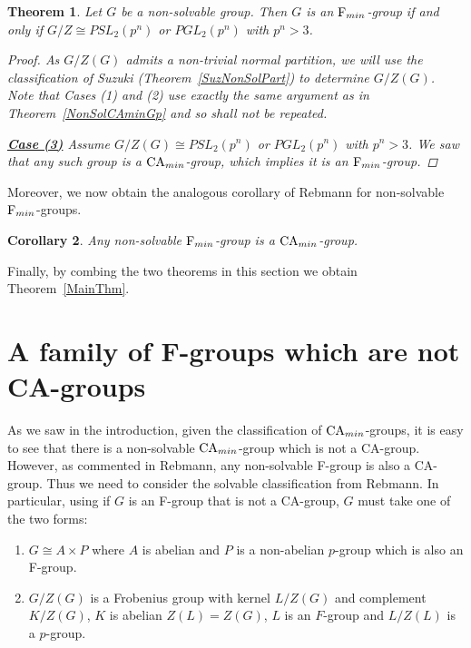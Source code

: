 \documentclass[a4paper,11pt]{article}
\theoremstyle{plain}
\newtheorem{thm}{Theorem}[section]
\newtheorem{cor}[thm]{Corollary}
\numberwithin{thm}{section}
\begin{document}
\begin{thm}
Let $G$ be a non-solvable group.
Then $G$ is an ${\rm F}_{min}$-group if and only if  $G/Z\cong PSL_2(p^n)$ or $PGL_2(p^n)$ with $p^n>3$.
\begin{proof}
As $G/Z(G)$ admits a non-trivial normal partition, we will use the classification of Suzuki (Theorem~\ref{SuzNonSolPart}) to determine $G/Z(G)$.
Note that Cases (1) and (2) use exactly the same argument as in Theorem~\ref{NonSolCAminGp} and so shall not be repeated.

\underline{\bf Case (3)}\newline
Assume $G/Z(G)\cong PSL_2(p^n)$ or $PGL_2(p^n)$ with $p^n>3$.
We saw that any such group is a ${\rm CA}_{min}$-group, which implies it is an ${\rm F}_{min}$-group.
\end{proof}
\end{thm}

Moreover, we now obtain the analogous corollary of Rebmann for non-solvable ${\rm F}_{min}$-groups.

\begin{cor}
Any non-solvable ${\rm F}_{min}$-group is a ${\rm CA}_{min}$-group.
\end{cor}


Finally, by combing the two theorems in this section we obtain Theorem~\ref{MainThm}.

\section{A family of F-groups which are not CA-groups}
As we saw in the introduction, given the classification of ${\rm CA}_{min}$-groups, it is easy to see that there is a non-solvable ${\rm CA}_{min}$-group which is not a CA-group.
However, as commented in Rebmann, any non-solvable F-group is also a CA-group.
Thus we need to consider the solvable classification from Rebmann.
In particular, using \cite[Corollary 5.1]{FGroups} if $G$ is an F-group that is not a CA-group, $G$ must take one of the two forms:

\begin{enumerate}
\item $G\cong A\times P$ where $A$ is abelian and $P$ is a non-abelian $p$-group which is also an F-group.
\item $G/Z(G)$ is a Frobenius group with kernel $L/Z(G)$ and complement $K/Z(G)$, $K$ is abelian $Z(L)=Z(G)$, $L$ is an $F$-group and $L/Z(L)$ is a $p$-group. 
\end{enumerate}
\end{document}
